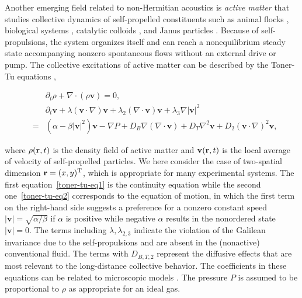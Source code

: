 \documentclass{tADP2e}
\theoremstyle{plain}
\newcommand{\eqn}[1]{
\begin{eqnarray}
	#1
\end{eqnarray}
}
\theoremstyle{plain}
\theoremstyle{definition}
\begin{document}
\vspace{3pt}
\noindent
Another emerging field related to non-Hermitian acoustics is {\it active matter} that studies collective dynamics of self-propelled constituents such as animal flocks \cite{Vicsek1995,Vicsek2012}, biological systems \cite{Brugues2014,Saw2017,Kawaguchi2017,Nishiguchi2018}, catalytic colloids \cite{Palacci2013}, and Janus particles \cite{Jiang2010}. Because of  self-propulsions, the system organizes itself and can reach a nonequilibrium steady state accompanying nonzero spontaneous flows without an external drive or pump.
The collective excitations of active matter can be described by the Toner-Tu equations \cite{Toner1995,Toner1998,Toner2005,Marchetti2013},
\eqn{\label{toner-tu-eq1}
&&\partial_t \rho + \nabla \cdot (\rho \mathbf{v}) = 0,\\
&&\partial_t \mathbf{v} + \lambda (\mathbf{v} \cdot \nabla) \mathbf{v} + \lambda_2 (\nabla \cdot \mathbf{v}) \mathbf{v} + \lambda_3  \nabla |\mathbf{v}|^2 \nonumber\\
&= &(\alpha-\beta|\mathbf{v}|^2)\mathbf{v}-\nabla P +D_B \nabla (\nabla \cdot \mathbf{v}) + D_T \nabla^2 \mathbf{v} + D_2(\mathbf{v} \cdot \nabla)^2 \mathbf{v},
\label{toner-tu-eq2}
}
where $\rho({\bf r},t)$ is the density field of active matter and $\mathbf{v}({\bf r},t)$ is the local average of velocity of self-propelled particles. We here consider the case of two-spatial dimension ${\bf r}=(x,y)^{\rm T}$, which is appropriate for many experimental systems. The first equation~\eqref{toner-tu-eq1} is the continuity equation while the second one~\eqref{toner-tu-eq2} corresponds to the equation of motion, in which  the first term on the right-hand side suggests a preference for a nonzero constant speed $|\mathbf{v}|=\sqrt{\alpha/\beta}$ if $\alpha$ is positive while negative $\alpha$ results in the nonordered state $|\mathbf{v}| = 0$. The terms including $\lambda,\lambda_{2,3}$ indicate the violation of the Galilean invariance due to the self-propulsions and are absent in the (nonactive) conventional fluid. The terms with $D_{B,T,2}$ represent the diffusive effects that are most relevant to the long-distance collective behavior. The coefficients in these equations can be related to  microscopic models \cite{Bertin2006,Peshkov2014,Farrell2012,Suzuki2015}.  The pressure $P$ is assumed to be proportional to $\rho$ as appropriate for an ideal gas. 
\end{document}
